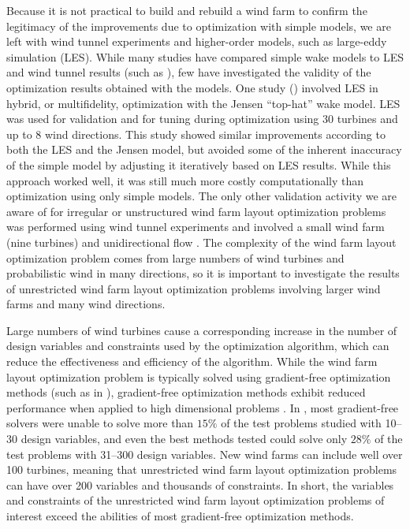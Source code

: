 \documentclass[conf]{new-aiaa}
\begin{document}
Because it is not practical to build and rebuild a wind farm to confirm the legitimacy of the improvements due to optimization with simple models, we are left with wind tunnel experiments and higher-order models, such as large-eddy simulation (LES). While many studies have compared simple wake models to LES and wind tunnel results (such as \cite{crespo1999,barthelmie2005,barthelmie2009,gaumond2012,beaucage2012,moriarty2014,annoni2014,andersen2014,gocmen2016,machefaux2015}), few have investigated the validity of the optimization results obtained with the models. One study (\cite{bokharaie2016}) involved LES in hybrid, or multifidelity, optimization with the Jensen ``top-hat'' wake model. LES was used for validation and for tuning during optimization using 30 turbines and up to 8 wind directions. This study showed similar improvements according to both the LES and the Jensen model, but avoided some of the inherent inaccuracy of the simple model by adjusting it iteratively based on LES results. While this approach worked well, it was still much more costly computationally than optimization using only simple models. The only other validation activity we are aware of for irregular or unstructured wind farm layout optimization problems was performed using wind tunnel experiments and involved a small wind farm (nine turbines) and unidirectional flow \cite{chowdhury2012}. The complexity of the wind farm layout optimization problem comes from large numbers of wind turbines and probabilistic wind in many directions, so it is important to investigate the results of unrestricted wind farm layout optimization problems involving larger wind farms and many wind directions. 

Large numbers of wind turbines cause a corresponding increase in the number of design variables and constraints used by the optimization algorithm, which can reduce the effectiveness and efficiency of the algorithm. While the wind farm layout optimization problem is typically solved using gradient-free optimization methods \cite{acero2014} (such as in \cite{grady2005,elkinton2008,gonzalez2010,kusiak2010,moorthy2014, turner2014-grid-milp-wflo,graf2016,perez-moreno2018}), gradient-free optimization methods exhibit reduced performance when applied to high dimensional problems \cite{rios2013-grad-free-comparison}. In \cite{rios2013-grad-free-comparison}, most gradient-free solvers were unable to solve more than $15\%$ of the test problems studied with 10--30 design variables, and even the best methods tested could solve only $28\%$ of the test problems with 31--300 design variables. New wind farms can include well over 100 turbines, meaning that unrestricted wind farm layout optimization problems can have over 200 variables and thousands of constraints. In short, the variables and constraints of the unrestricted wind farm layout optimization problems of interest exceed the abilities of most gradient-free optimization methods.
\end{document}
